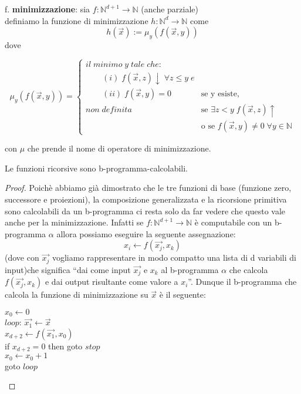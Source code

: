 f. \textbf{minimizzazione}: sia $f: \mathbb{N}^{d+1} \to \mathbb{N}$ (anche
parziale)\\
definiamo la funzione di minimizzazione $h: \mathbb{N}^{d} \to \mathbb{N}$ come
$$ h(\vec{x}):= \mu_{y}(f(\vec{x},y)) $$
dove

\[\mu_{y}(f(\vec{x},y)) = 
\begin{cases}
il \; minimo \; y \; tale \; che: \\
\qquad (i) \; f(\vec{x},z)\downarrow \; \forall z \leq y \; e \\
\qquad (ii) \; f(\vec{x},y)=0 & \text{se y esiste,} \\
non \; definita \; & \text{se $\exists z < y \; f(\vec{x},z) \uparrow$}\\
 & \text{o se $f(\vec{x},y)\neq 0 \; \forall y \in \mathbb{N} $}
\end{cases} \]

con $\mu$ che prende il nome di operatore di minimizzazione.
\begin{thm} Le funzioni ricorsive sono b-programma-calcolabili.
\end{thm}
\begin{proof} Poich\`e abbiamo gi\`a dimostrato che le tre funzioni di base
(funzione zero, successore e proiezioni), la composizione generalizzata e la
ricorsione primitiva sono calcolabili da un b-programma ci resta solo da far
vedere che questo vale anche per la minimizzazione. Infatti se
$f:\mathbb{N}^{d+1} \to \mathbb{N}$ \`e computabile con un b-programma $\alpha$
allora possiamo eseguire la seguente assegnazione:
$$x_i \leftarrow f(\vec{x_{j}}, x_k)$$
(dove con $\vec{x_{j}}$ vogliamo rappresentare in modo compatto una lista di d
variabili di input)che significa "`dai come input $\vec{x_{j}}$ e $x_k$ al
b-programma $\alpha$ che calcola $f(\vec{x_{j}}, x_k)$ e dai output risultante
come valore a $x_i$"'. Dunque il b-programma che calcola la funzione di
minimizzazione su $\vec{x}$ \`e il seguente:\\
   \begin{mylisting}
       $x_0 \leftarrow 0$ \\
       $loop$: $\vec{x_{1}} \leftarrow \vec{x}$\\
       $x_{d+2} \leftarrow f(\vec{x_{1}}, x_0)$\\
       if $x_{d+2} = 0$ then goto $stop$\\
       $x_0 \leftarrow x_0 + 1$\\
       goto $loop$
  \end{mylisting}
\end{proof}

